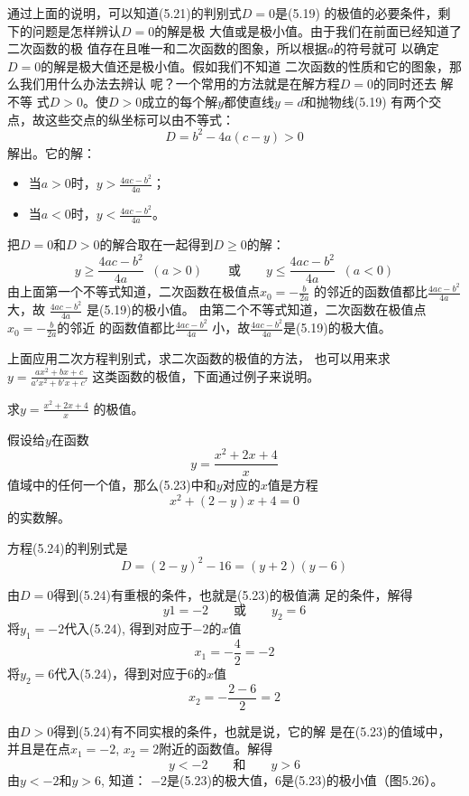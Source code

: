 通过上面的说明，可以知道(5.21)的判别式$D=0$是(5.19)
的极值的必要条件，剩下的问题是怎样辨认$D=0$的解是极
大值或是极小值。由于我们在前面已经知道了二次函数的极
值存在且唯一和二次函数的图象，所以根据$a$的符号就可
以确定$D=0$的解是极大值还是极小值。假如我们不知道
二次函数的性质和它的图象，那么我们用什么办法去辨认
呢？一个常用的方法就是在解方程$D=0$的同时还去 解不等
式$D>0$。使$D>0$成立的每个解$y$都使直线$y=d$和抛物线(5.19)
有两个交点，故这些交点的纵坐标可以由不等式：
\[D=b^2-4a(c-y)>0\]
解出。它的解：
\begin{itemize}
    \item 当$a>0$时，$y>\frac{4ac-b^2}{4a}$；
    \item 当$a<0$时，$y<\frac{4ac-b^2}{4a}$。
\end{itemize}

把$D=0$和$D>0$的解合取在一起得到$D\ge 0$的解：
\[y\ge \frac{4ac-b^2}{4a}\;\; (a>0)\qquad \text{或}\qquad y\le \frac{4ac-b^2}{4a}\;\; (a<0)\]
由上面第一个不等式知道，二次函数在极值点$x_0=-\frac{b}{2a}$
的邻近的函数值都比$\frac{4ac-b^2}{4a}$大，故
$\frac{4ac-b^2}{4a}$
是(5.19)的极小值。
由第二个不等式知道，二次函数在极值点$x_0=-\frac{b}{2a}$的邻近
的函数值都比$\frac{4ac-b^2}{4a}$
小，故$\frac{4ac-b^2}{4a}$是(5.19)的极大值。

上面应用二次方程判别式，求二次函数的极值的方法，
也可以用来求$y=\frac{ax^2+bx+c}{a'x^2+b'x+c'}$
这类函数的极值，下面通过例子来说明。





\begin{example}
    求$y=\frac{x^2+2x+4}{x}$
的极值。
\end{example}

\begin{solution}
    假设给$y$在函数
    \begin{equation}
        y=\frac{x^2+2x+4}{x}
    \end{equation}
    值域中的任何一个值，那么(5.23)中和$y$对应的$x$值是方程
    \begin{equation}
        x^2+(2-y)x+4=0
    \end{equation}
    的实数解。

    方程(5.24)的判别式是
    \begin{equation}
        D=(2-y)^2-16=(y+2)(y-6)
    \end{equation}

    由$D=0$得到(5.24)有重根的条件，也就是(5.23)的极值满
    足的条件，解得
 \[   y1=-2\qquad \text{或}\qquad y_2=6\]
    将$y_1=-2$代入(5.24), 得到对应于$-2$的$x$值
  \[  x_1=-\frac{4}{2}=-2\]
    将$y_2=6$代入(5.24)，得到对应于6的$x$值
    \[x_2=-\frac{2-6}{2}=2\]

    由$D>0$得到(5.24)有不同实根的条件，也就是说，它的解
    是在(5.23)的值域中，并且是在点$x_1=-2$, $x_2=2$附近的函数值。解得
  \[  y<-2\qquad \text{和}\qquad y>6\]
    由$y<-2$和$y>6$, 知道：
    $-2$是(5.23)的极大值，6是(5.23)的极小值（图5.26）。
\end{solution}


